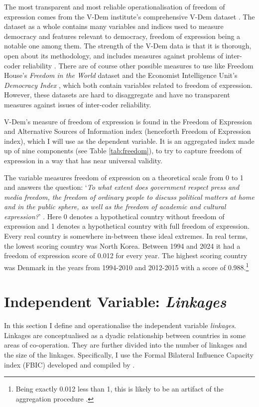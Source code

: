 The most transparent and most reliable operationalisation of freedom of expression comes from the V-Dem institute's comprehensive V-Dem dataset \citep{coppedge_v-dem_2025}. The dataset as a whole contains many variables and indices used to measure democracy and features relevant to democracy, freedom of expression being a notable one among them. The strength of the V-Dem data is that it is thorough, open about its methodology, and includes measures against problems of inter-coder reliability \citep{coppedge_v-dem_2024-2}. There are of course other possible measures to use like Freedom House's \textit{Freedom in the World} dataset \citep{freedom_house_freedom_2024} and the Economist Intelligence Unit's \textit{Democracy Index} \citep{economist_intelligence_unit_democracy_2024}, which both contain variables related to freedom of expression. However, these datasets are hard to disaggregate and have no transparent measures against issues of inter-coder reliability.

V-Dem's measure of freedom of expression is found in the Freedom of Expression and Alternative Sources of Information index (henceforth Freedom of Expression index), which I will use as the dependent variable. It is an aggregated index made up of nine components (see Table \ref{tab:freedom}), to try to capture freedom of expression in a way that has near universal validity. 

The variable measures freedom of expression on a theoretical scale from 0 to 1 and answers the question: `\textit{To what extent does government respect press and media freedom, the freedom of ordinary people to discuss political matters at home and in the public sphere, as well as the freedom of academic and cultural expression?}' \citep[pp. 50-51]{coppedge_v-dem_2024-1}. Here 0 denotes a hypothetical country without freedom of expression and 1 denotes a hypothetical country with full freedom of expression. Every real country is somewhere in-between these ideal extremes. In  real terms, the lowest scoring country was North Korea. Between 1994 and 2024 it had a freedom of expression score of 0.012 for every year. The highest scoring country was Denmark in the years from 1994-2010 and 2012-2015 with a score of 0.988.\footnote{Being exactly 0.012 less than 1, this is likely to be an artifact of the aggregation procedure \citep{coppedge_v-dem_2024-2}.}

\section{Independent Variable: \textit{Linkages}}
In this section I define and operationalise the independent variable \textit{linkages}. Linkages are conceptualised as a dyadic relationship between countries in some areas of co-operation. They are further divided into the number of linkages and the size of the linkages. Specifically, I use the Formal Bilateral Influence Capacity index (FBIC) developed and compiled by \citet{moyer_china-us_2021}.

